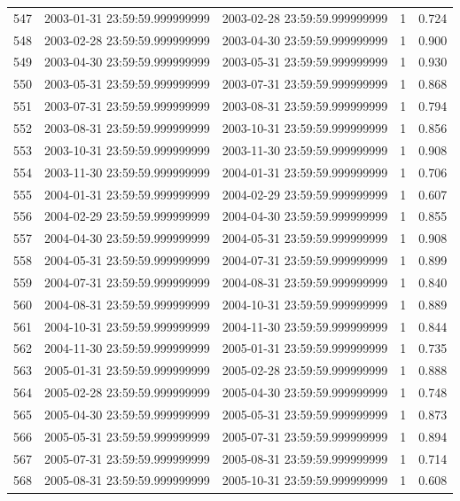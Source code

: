 \begin{table}
\begin{tabular}{lcccc}
547 & 2003-01-31 23:59:59.999999999 & 2003-02-28 23:59:59.999999999 & 1 & 0.724 \\
548 & 2003-02-28 23:59:59.999999999 & 2003-04-30 23:59:59.999999999 & 1 & 0.900 \\
549 & 2003-04-30 23:59:59.999999999 & 2003-05-31 23:59:59.999999999 & 1 & 0.930 \\
550 & 2003-05-31 23:59:59.999999999 & 2003-07-31 23:59:59.999999999 & 1 & 0.868 \\
551 & 2003-07-31 23:59:59.999999999 & 2003-08-31 23:59:59.999999999 & 1 & 0.794 \\
552 & 2003-08-31 23:59:59.999999999 & 2003-10-31 23:59:59.999999999 & 1 & 0.856 \\
553 & 2003-10-31 23:59:59.999999999 & 2003-11-30 23:59:59.999999999 & 1 & 0.908 \\
554 & 2003-11-30 23:59:59.999999999 & 2004-01-31 23:59:59.999999999 & 1 & 0.706 \\
555 & 2004-01-31 23:59:59.999999999 & 2004-02-29 23:59:59.999999999 & 1 & 0.607 \\
556 & 2004-02-29 23:59:59.999999999 & 2004-04-30 23:59:59.999999999 & 1 & 0.855 \\
557 & 2004-04-30 23:59:59.999999999 & 2004-05-31 23:59:59.999999999 & 1 & 0.908 \\
558 & 2004-05-31 23:59:59.999999999 & 2004-07-31 23:59:59.999999999 & 1 & 0.899 \\
559 & 2004-07-31 23:59:59.999999999 & 2004-08-31 23:59:59.999999999 & 1 & 0.840 \\
560 & 2004-08-31 23:59:59.999999999 & 2004-10-31 23:59:59.999999999 & 1 & 0.889 \\
561 & 2004-10-31 23:59:59.999999999 & 2004-11-30 23:59:59.999999999 & 1 & 0.844 \\
562 & 2004-11-30 23:59:59.999999999 & 2005-01-31 23:59:59.999999999 & 1 & 0.735 \\
563 & 2005-01-31 23:59:59.999999999 & 2005-02-28 23:59:59.999999999 & 1 & 0.888 \\
564 & 2005-02-28 23:59:59.999999999 & 2005-04-30 23:59:59.999999999 & 1 & 0.748 \\
565 & 2005-04-30 23:59:59.999999999 & 2005-05-31 23:59:59.999999999 & 1 & 0.873 \\
566 & 2005-05-31 23:59:59.999999999 & 2005-07-31 23:59:59.999999999 & 1 & 0.894 \\
567 & 2005-07-31 23:59:59.999999999 & 2005-08-31 23:59:59.999999999 & 1 & 0.714 \\
568 & 2005-08-31 23:59:59.999999999 & 2005-10-31 23:59:59.999999999 & 1 & 0.608 \\

\end{tabular}
\end{table}
